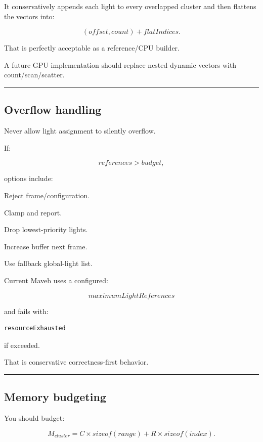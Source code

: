 It conservatively appends each light to every overlapped cluster and then flattens the vectors into:

\[
(offset,count)
+
flatIndices.
\]

That is perfectly acceptable as a reference/CPU builder.

A future GPU implementation should replace nested dynamic vectors with count/scan/scatter.

\begin{center}\rule{0.5\linewidth}{0.5pt}\end{center}

\subsection{Overflow handling}\label{04-visual-computing-ii-ch040-overflow-handling}

Never allow light assignment to silently overflow.

If:

\[
references>budget,
\]

options include:

Reject frame/configuration.

Clamp and report.

Drop lowest-priority lights.

Increase buffer next frame.

Use fallback global-light list.

Current Maveb uses a configured:

\[
maximumLightReferences
\]

and fails with:

\begin{verbatim}
resourceExhausted
\end{verbatim}

if exceeded.

That is conservative correctness-first behavior.

\begin{center}\rule{0.5\linewidth}{0.5pt}\end{center}

\subsection{Memory budgeting}\label{04-visual-computing-ii-ch040-memory-budgeting}

You should budget:

\[
M_{cluster}
=
C\times sizeof(range)
+
R\times sizeof(index).
\]

